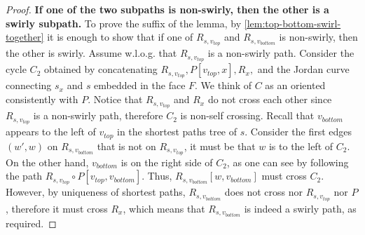 \documentclass{article}
\begin{document}
\begin{proof}
\medskip
\noindent
{\bf If one of the two subpaths is non-swirly, then the other is a swirly subpath.}
To prove the suffix of the lemma, by \cref{lem:top-bottom-swirl-together} it is enough to show that if one of $R_{s,v_{top}}$ and $R_{s,v_{bottom}}$ is non-swirly, then the other is swirly.
Assume w.l.o.g. that $R_{s,v_{top}}$ is a non-swirly path.
Consider the cycle $C_2$ obtained by concatenating $R_{s,v_{top}}, P[v_{top},x], R_x,$  and the Jordan curve connecting $s_x$ and $s$ embedded in the face $F$.
We think of $C$ as an oriented consistently with $P$.
Notice that $R_{s,v_{top}}$ and $R_x$ do not cross each other since $R_{s,v_{top}}$ is a non-swirly path, therefore $C_2$ is non-self crossing.
Recall that $v_{bottom}$ appears to the left of $v_{top}$ in the shortest paths tree of $s$.
Consider the first edges $(w',w)$ on $R_{s,v_{bottom}}$ that is not on $R_{s,v_{top}}$, it must be that $w$ is to the left of $C_2$.
On the other hand, $v_{bottom}$ is on the right side of $C_2$, as one can see by following the path $R_{s,v_{top}}\circ P[v_{top},v_{bottom}]$.
Thus, $R_{s,v_{bottom}}[w,v_{bottom}]$ must cross $C_2$.
However, by uniqueness of shortest paths, $R_{s,v_{bottom}}$ does not cross nor $R_{s,v_{top}}$ nor $P$, therefore it must cross $R_x$, which means that $R_{s,v_{bottom}}$ is indeed a swirly path, as required.
\end{proof}
\end{document}
